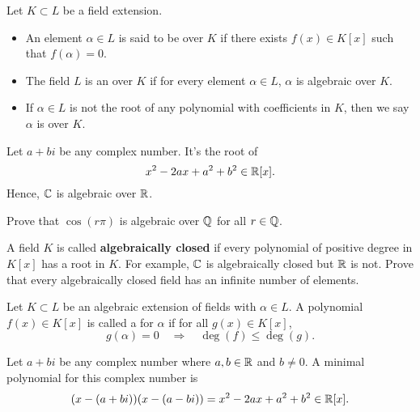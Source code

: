 \documentclass{ximera}
\begin{document}
\begin{definition}
  Let $K\subset L$ be a field extension.
  \begin{itemize}
  \item An element $\alpha\in L$ is said to be  over
    $K$ if there exists $f(x) \in K[x]$ such that $f(\alpha) = 0$.
  \item The field $L$ is an  over $K$ if for
    every element $\alpha\in L$, $\alpha$ is algebraic over $K$.
  \item If $\alpha\in L$ is not the root of any polynomial with
    coefficients in $K$, then we say $\alpha$ is 
    over $K$.
  \end{itemize}
\end{definition}

\begin{example}
  Let $a+ bi$ be any complex number. It's the root of
  \[
  x^2 -2ax + a^2 + b^2 \in \mathbb R[x].
  \]
  Hence, $\mathbb C$ is algebraic over $\mathbb R$.
\end{example}

\begin{exercise}
  Prove that $\cos(r\pi)$ is algebraic over $\mathbb Q$ for all $r\in\mathbb Q$.
\end{exercise}

\begin{exercise}
  A field $K$ is called \textbf{algebraically closed} if every
  polynomial of positive degree in $K[x]$ has a root in $K$. For
  example, $\mathbb C$ is algebraically closed but $\mathbb R$ is not. Prove that
  every algebraically closed field has an infinite number of elements.
\end{exercise}


\begin{definition}
  Let $K\subset L$ be an algebraic extension of fields with
  $\alpha\in L$. A polynomial $f(x)\in K[x]$ is called a  for $\alpha$ if for all $g(x)\in K[x]$,
  \[
  g(\alpha) = 0 \quad\Rightarrow\quad \deg(f) \le \deg(g).
  \]
\end{definition}

\begin{example}
  Let $a+bi$ be any complex number where $a,b\in\mathbb R$ and $b\ne 0$. A
  minimal polynomial for this complex number is
  \[
  (x-(a+bi))(x-(a-bi)) = x^2 -2ax +a^2 + b^2\in\mathbb R[x].
  \]
\end{example}
\end{document}
